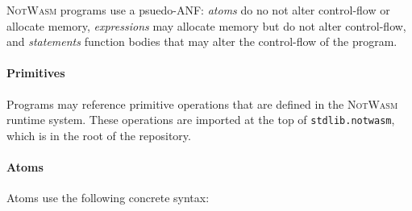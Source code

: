 \documentclass{book}
\newcommand{\notwasm}{\textsc{NotWasm}\xspace}
\begin{document}
\notwasm programs use a psuedo-ANF: \emph{atoms} do no not alter control-flow
or allocate memory, \emph{expressions} may allocate memory but do not alter
control-flow, and \emph{statements} function bodies that may alter the
control-flow of the program.

\paragraph{Primitives} Programs may reference primitive operations that are
defined in the \notwasm runtime system. These operations are imported at the
top of \texttt{stdlib.notwasm}, which is in the root of the repository.

\paragraph{Atoms}
Atoms use the following concrete syntax:
\end{document}
